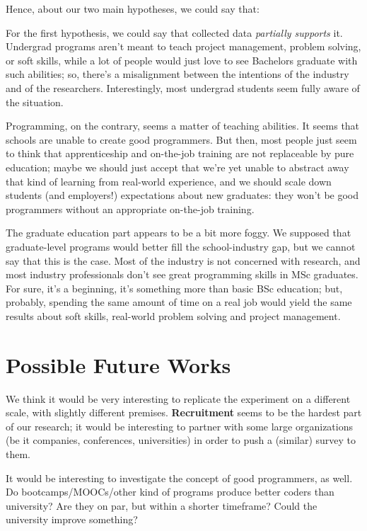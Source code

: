 \documentclass{sigchi}
\begin{document}
Hence, about our two main hypotheses, we could say that:

For the first hypothesis, we could say that collected data \textit{partially supports} it. Undergrad programs aren't meant to teach project management, problem solving, or soft skills, while a lot of people would just love to see Bachelors graduate with such abilities; so, there's a misalignment between the intentions of the industry and of the researchers. Interestingly, most undergrad students seem fully aware of the situation.

Programming, on the contrary, seems a matter of teaching abilities. It seems that schools are unable to create good programmers. But then, most people just seem to think that apprenticeship and on-the-job training are not replaceable by pure education; maybe we should just accept that we're yet unable to abstract away that kind of learning from real-world experience, and we should scale down students (and employers!) expectations about new graduates: they won't be good programmers without an appropriate on-the-job training.

The graduate education part appears to be a bit more foggy. We supposed that graduate-level programs would better fill the school-industry gap, but we cannot say that this is the case. Most of the industry is not concerned with research, and most industry professionals don't see great programming skills in MSc graduates. For sure, it's a beginning, it's something more than basic BSc education; but, probably, spending the same amount of time on a real job would yield the same results about soft skills, real-world problem solving and project management.

\section{Possible Future Works}
We think it would be very interesting to replicate the experiment on a different scale, with slightly different premises. \textbf{Recruitment} seems to be the hardest part of our research; it would be interesting to partner with some large organizations (be it companies, conferences, universities) in order to push a (similar) survey to them.

It would be interesting to investigate the concept of good programmers, as well. Do bootcamps/MOOCs/other kind of programs produce better coders than university? Are they on par, but within a shorter timeframe? Could the university improve something?






\balance{}

\balance{}



\end{document}
